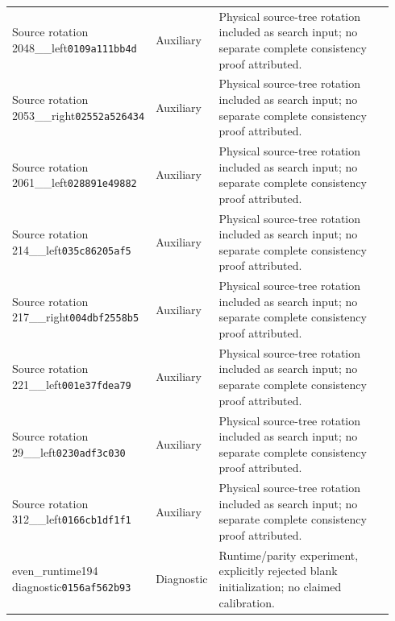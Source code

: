 {\begin{longtable}{@{}p{0.23\linewidth}p{0.13\linewidth}p{0.58\linewidth}@{}}
Source rotation 2048\_\allowbreak 2049\_\allowbreak left\newline\texttt{0109a111bb4d} & Auxiliary & Physical source-tree rotation included as search input; no separate complete consistency proof attributed.\\[2.5pt]
Source rotation 2053\_\allowbreak 2054\_\allowbreak right\newline\texttt{02552a526434} & Auxiliary & Physical source-tree rotation included as search input; no separate complete consistency proof attributed.\\[2.5pt]
Source rotation 2061\_\allowbreak 2062\_\allowbreak left\newline\texttt{028891e49882} & Auxiliary & Physical source-tree rotation included as search input; no separate complete consistency proof attributed.\\[2.5pt]
Source rotation 214\_\allowbreak 312\_\allowbreak left\newline\texttt{035c86205af5} & Auxiliary & Physical source-tree rotation included as search input; no separate complete consistency proof attributed.\\[2.5pt]
Source rotation 217\_\allowbreak 197\_\allowbreak right\newline\texttt{004dbf2558b5} & Auxiliary & Physical source-tree rotation included as search input; no separate complete consistency proof attributed.\\[2.5pt]
Source rotation 221\_\allowbreak 217\_\allowbreak left\newline\texttt{001e37fdea79} & Auxiliary & Physical source-tree rotation included as search input; no separate complete consistency proof attributed.\\[2.5pt]
Source rotation 29\_\allowbreak 44\_\allowbreak left\newline\texttt{0230adf3c030} & Auxiliary & Physical source-tree rotation included as search input; no separate complete consistency proof attributed.\\[2.5pt]
Source rotation 312\_\allowbreak 38\_\allowbreak left\newline\texttt{0166cb1df1f1} & Auxiliary & Physical source-tree rotation included as search input; no separate complete consistency proof attributed.\\[2.5pt]
even\_\allowbreak runtime194 diagnostic\newline\texttt{0156af562b93} & Diagnostic & Runtime/parity experiment, explicitly rejected blank initialization; no claimed calibration.\\[2.5pt]
\bottomrule
\end{longtable}
}

